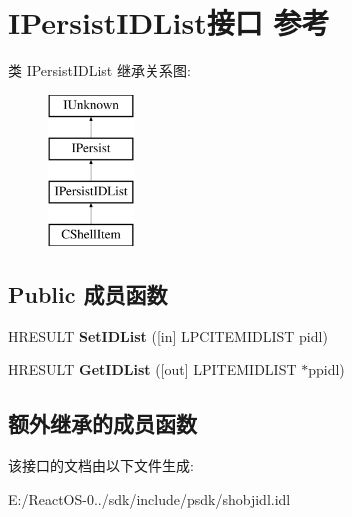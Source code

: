 \hypertarget{interface_i_persist_i_d_list}{}\section{I\+Persist\+I\+D\+List接口 参考}
\label{interface_i_persist_i_d_list}
类 I\+Persist\+I\+D\+List 继承关系图\+:\begin{figure}[H]
\begin{center}
\leavevmode
\includegraphics[height=4.000000cm]{interface_i_persist_i_d_list}
\end{center}
\end{figure}
\subsection*{Public 成员函数}
\begin{DoxyCompactItemize}
\item 
\mbox{\label{interface_i_persist_i_d_list_a53a0af4b1705c75ab7451206f92e669c}} 
H\+R\+E\+S\+U\+LT {\bfseries Set\+I\+D\+List} (\mbox{[}in\mbox{]} L\+P\+C\+I\+T\+E\+M\+I\+D\+L\+I\+ST pidl)
\item 
\mbox{\label{interface_i_persist_i_d_list_a11b2523cace3e3411da590fac27cde99}} 
H\+R\+E\+S\+U\+LT {\bfseries Get\+I\+D\+List} (\mbox{[}out\mbox{]} L\+P\+I\+T\+E\+M\+I\+D\+L\+I\+ST $\ast$ppidl)
\end{DoxyCompactItemize}
\subsection*{额外继承的成员函数}


该接口的文档由以下文件生成\+:\begin{DoxyCompactItemize}
\item 
E\+:/\+React\+O\+S-\/0../sdk/include/psdk/shobjidl.\+idl\end{DoxyCompactItemize}
